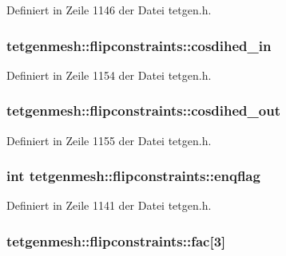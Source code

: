 Definiert in Zeile 1146 der Datei tetgen.\-h.

\hypertarget{classtetgenmesh_1_1flipconstraints_a04bbb705181108809fa35a24fd2b32b0}{
\subsubsection[{cosdihed\-\_\-in}]{ tetgenmesh\-::flipconstraints\-::cosdihed\-\_\-in}}\label{classtetgenmesh_1_1flipconstraints_a04bbb705181108809fa35a24fd2b32b0}


Definiert in Zeile 1154 der Datei tetgen.\-h.

\hypertarget{classtetgenmesh_1_1flipconstraints_a546d64ebfd4f8bb01b5f4f56dde43a07}{
\subsubsection[{cosdihed\-\_\-out}]{ tetgenmesh\-::flipconstraints\-::cosdihed\-\_\-out}}\label{classtetgenmesh_1_1flipconstraints_a546d64ebfd4f8bb01b5f4f56dde43a07}


Definiert in Zeile 1155 der Datei tetgen.\-h.

\hypertarget{classtetgenmesh_1_1flipconstraints_ad16c3c6607dd1bedc7b580245ed34f56}{
\subsubsection[{enqflag}]{\setlength{\rightskip}{0pt plus 5cm}int tetgenmesh\-::flipconstraints\-::enqflag}}\label{classtetgenmesh_1_1flipconstraints_ad16c3c6607dd1bedc7b580245ed34f56}


Definiert in Zeile 1141 der Datei tetgen.\-h.

\hypertarget{classtetgenmesh_1_1flipconstraints_a99946dec792882c06d7608bb9967e5bb}{
\subsubsection[{fac}]{ tetgenmesh\-::flipconstraints\-::fac\mbox{[}3\mbox{]}}}\label{classtetgenmesh_1_1flipconstraints_a99946dec792882c06d7608bb9967e5bb}


